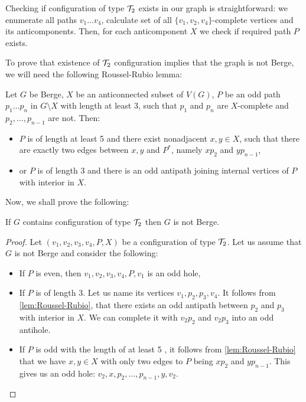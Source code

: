 Checking if configuration of type $\mathcal{T}_2$ exists in our graph is straightforward: we enumerate all paths $v_1\ldots v_4$, calculate set of all $\{v_1, v_2, v_4\}$-complete vertices and its anticomponents. Then, for each anticomponent $X$ we check if required path $P$ exists.

To prove that existence of $\mathcal{T}_2$ configuration implies that the graph is not Berge, we will need the following Roussel-Rubio lemma:

\begin{lemma}\label{lem:Roussel-Rubio}
	Let $G$ be Berge, $X$ be an anticonnected subset of $V(G)$, $P$ be an odd path $p_1\ldots p_n$ in $G\setminus X$ with length at least 3, such that $p_1$ and $p_n$ are $X$-complete and $p_2, \ldots, p_{n-1}$ are not. Then:
	\begin{itemize}
		\item $P$ is of length at least 5 and there exist nonadjacent $x, y \in X$, such that there are exactly two edges between $x, y$ and $P^*$, namely $xp_2$ and $yp_{n-1}$,
		\item or $P$ is of length 3 and there is an odd antipath joining internal vertices of $P$ with interior in $X$.
	\end{itemize}
\end{lemma}

Now, we shall prove the following:

\begin{theorem}
	If $G$ contains configuration of type $\mathcal{T}_2$ then $G$ is not Berge.
\end{theorem}
\begin{proof}
	Let $(v_1, v_2, v_3, v_4, P, X)$ be a configuration of type $\mathcal{T}_2$. Let us assume that $G$ is not Berge and consider the following:
	\begin{itemize}
		\item If $P$ is even, then $v_1, v_2, v_3, v_4, P, v_1$ is an odd hole,
		\item If $P$ is of length 3.  Let us name its vertices $v_1, p_2, p_3, v_4$. It follows from \cref{lem:Roussel-Rubio}, that there exists an odd antipath between $p_2$ and $p_3$ with interior in $X$. We can complete it with $v_2p_2$ and $v_2p_3$ into an odd antihole.
		\item If $P$ is odd with the length of at least 5 , it follows from \cref{lem:Roussel-Rubio} that we have $x, y \in X$ with only two edges to $P$ being $xp_2$ and $yp_{n-1}$. This gives us an odd hole: $v_2, x, p_2, \ldots, p_{n-1}, y, v_2$.
	\end{itemize}
\end{proof}

